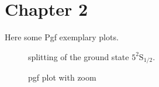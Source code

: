 \chapter{Chapter 2}\label{chap:chapter_2}
Here some Pgf exemplary plots.

\begin{figure}[H]
	\centering	
	\begin{tikzpicture}[scale=0.6]
		
	\end{tikzpicture}
	\caption[ splitting]{ splitting of the \Rb ground state $5^2\mathrm{S}_{1/2}$.}
	\label{fig:zeeman_splitting_breit_rabi}
\end{figure}

\begin{figure}[H]
	\centering
	\begin{tikzpicture}[scale=0.88]
		
	\end{tikzpicture}
	\caption[pgf plot with zoom]{pgf plot with zoom}
	\label{fig:vertical_transport_dynamics_a}
\end{figure}